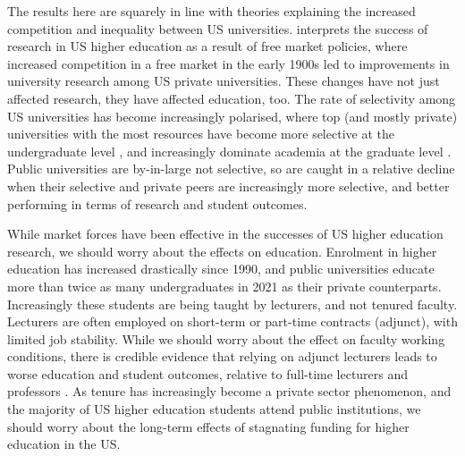 The results here are squarely in line with theories explaining the increased competition and inequality between US universities.
\cite{urquiola2020markets} interprets the success of research in US higher education as a result of free market policies, where increased competition in a free market in the early 1900s led to improvements in university research among US private universities.
These changes have not just affected research, they have affected education, too.
The rate of selectivity among US universities has become increasingly polarised, where top (and mostly private) universities with the most resources have become more selective at the undergraduate level \citep{hoxby2009changing}, and increasingly dominate academia at the graduate level \citep{wapman2022quantifying}.
Public universities are by-in-large not selective, so are caught in a relative decline when their selective and private peers are increasingly more selective, and better performing in terms of research and student outcomes.

While market forces have been effective in the successes of US higher education research, we should worry about the effects on education.
Enrolment in higher education has increased drastically since 1990, and public universities educate more than twice as many undergraduates in 2021 as their private counterparts.
Increasingly these students are being taught by lecturers, and not tenured faculty.
Lecturers are often employed on short-term or part-time contracts (adjunct), with limited job stability.
While we should worry about the effect on faculty working conditions, there is credible evidence that relying on adjunct lecturers leads to worse education and student outcomes, relative to full-time lecturers and professors \citep{zhu2021limited}.
As tenure has increasingly become a private sector phenomenon, and the majority of US higher education students attend public institutions, we should worry about the long-term effects of stagnating funding for higher education in the US.

